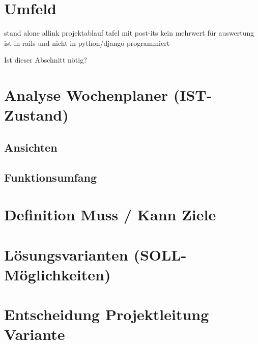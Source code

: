 \section{Umfeld}
stand alone
allink projektablauf
tafel mit post-its
kein mehrwert für auswertung
ist in rails und nicht in python/django programmiert

Ist dieser Abschnitt nötig?

\section{Analyse Wochenplaner (IST-Zustand)}
\subsection{Ansichten}
\subsection{Funktionsumfang}

\section{Definition Muss / Kann Ziele}

\section{Lösungsvarianten (SOLL-Möglichkeiten)}

\section{Entscheidung Projektleitung Variante}
